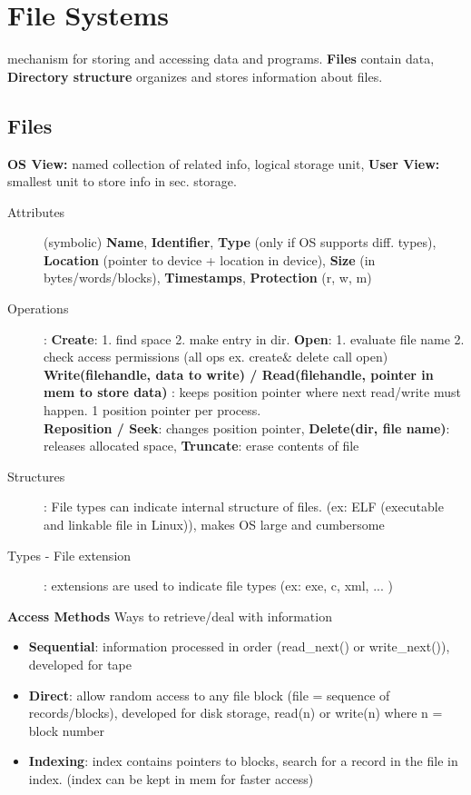 \section*{File Systems}
mechanism for storing and accessing data and programs. \textbf{Files} contain data, \textbf{Directory structure} organizes and stores information about files.
\subsection*{Files}
\textbf{OS View:}  named collection of related info, logical storage unit, \textbf{User View:}  smallest unit to store info in sec. storage.
\begin{description}
    \item[Attributes](symbolic) \textbf{Name}, \textbf{Identifier},  \textbf{Type} (only if OS supports diff. types), \textbf{Location} (pointer to device + location in device), \textbf{Size} (in bytes/words/blocks), \textbf{Timestamps}, \textbf{Protection} (r, w, m)
    \item[Operations]: \textbf{Create}: 1. find space 2. make entry in dir. \textbf{Open}: 1. evaluate file name 2. check access permissions (all ops ex. create\& delete call open) \textbf{Write(filehandle, data to write) / Read(filehandle, pointer in mem to store data) }: keeps position pointer where next read/write must happen. 1 position pointer per process. \\
    \textbf{Reposition / Seek}: changes position pointer, \textbf{Delete(dir, file name)}: releases allocated space, \textbf{Truncate}: erase contents of file
    \item[Structures]: File types can indicate internal structure of files. (ex: ELF (executable and linkable file in Linux)), makes OS large and cumbersome
    \item[Types - File extension]: extensions are used to indicate file types (ex: exe, c, xml, ... )
\end{description}
\textbf{Access Methods} Ways to retrieve/deal with information
\begin{itemize}
    \item \textbf{Sequential}: information processed in order (read\_next() or write\_next()), developed for tape
    \item \textbf{Direct}: allow random access to any file block (file = sequence of records/blocks), developed for disk storage, read(n) or write(n) where n = block number
    \item \textbf{Indexing}: index contains pointers to blocks, search for a record in the file in index. (index can be kept in mem for faster access)
\end{itemize}
